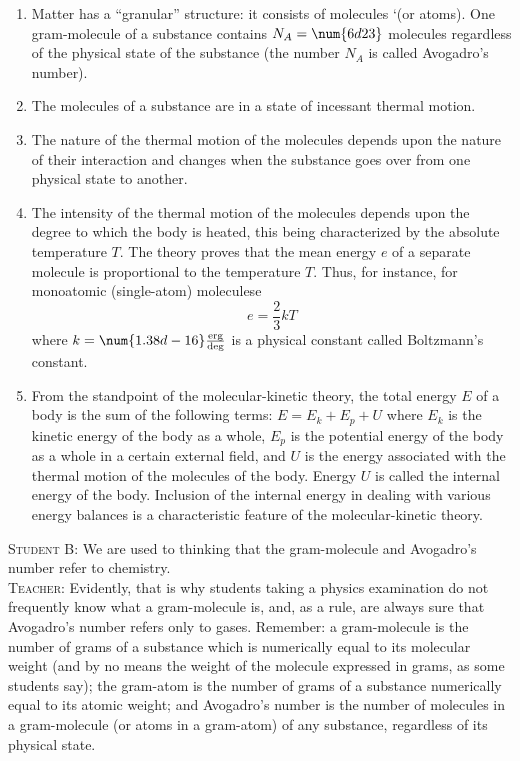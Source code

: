 \documentclass[a4paper,sfsidenotes]{tufte-book}
\begin{document}
\begin{enumerate}[label=\arabic*.,leftmargin=1cm]
\item Matter has a ``granular'' structure: it consists of molecules `(or atoms). One gram-molecule of a substance contains $N_{A} = \num{6d23}$ molecules regardless of the physical state of the substance (the number $N_{A}$ is called Avogadro's number).
\item The molecules of a substance are in a state of incessant thermal motion.
\item The nature of the thermal motion of the molecules depends upon the nature of their interaction and changes when the substance goes over from one physical state to another.
\item The intensity of the thermal motion of the molecules depends upon the degree to which the body is heated, this being characterized by the absolute temperature $T$. The theory proves that the mean energy $e$ of a separate molecule is proportional to the temperature $T$. Thus, for instance, for monoatomic (single-atom) moleculese
\begin{equation}
e = \frac{2}{3} kT 
\label{eq-98}
\end{equation}
where $k= \num{1.38d-16} \frac{\mathrm{erg}}{\mathrm{deg}}$ is a physical constant called Boltzmann's constant.

\item From the standpoint of the molecular-kinetic theory, the total energy $E$ of a body is the sum of the following terms: $E = E_{k} + E_{p} + U$ where $E_{k}$ is the kinetic energy of the body as a whole, $E_{p}$ is the potential energy of the body as a whole in a certain external field, and $U$ is the energy associated with the thermal motion of the molecules of the body. Energy $U$ is called the internal energy of the body. Inclusion of the internal energy in dealing with various energy balances is a characteristic feature of the molecular-kinetic theory.
\end{enumerate}
\textsc{Student B:} We are used to thinking that the gram-molecule and Avogadro's number refer to chemistry.
\\
\textsc{Teacher:} Evidently, that is why students taking a physics examination do not frequently know what a gram-molecule is, and, as a rule, are always sure that Avogadro's number refers only to gases. Remember: a gram-molecule is the number of grams of a substance which is numerically equal to its molecular weight (and by no means the weight of the molecule expressed in grams, as some students say); the gram-atom is the number of grams of a substance numerically equal to its atomic weight; and Avogadro's number is the number of molecules in a gram-molecule (or atoms in a gram-atom) of any substance, regardless of its physical state.
\end{document}
